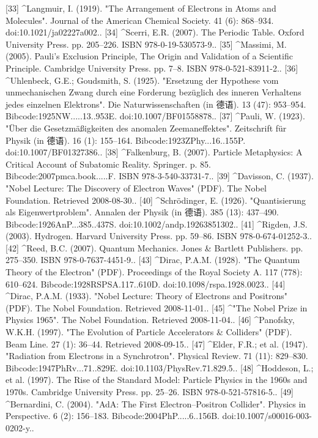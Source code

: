 [33]
^Langmuir, I. (1919). "The Arrangement of Electrons in Atoms and Molecules". Journal of the American Chemical Society. 41 (6): 868–934. doi:10.1021/ja02227a002..
[34]
^Scerri, E.R. (2007). The Periodic Table. Oxford University Press. pp. 205–226. ISBN 978-0-19-530573-9..
[35]
^Massimi, M. (2005). Pauli's Exclusion Principle, The Origin and Validation of a Scientific Principle. Cambridge University Press. pp. 7–8. ISBN 978-0-521-83911-2..
[36]
^Uhlenbeck, G.E.; Goudsmith, S. (1925). "Ersetzung der Hypothese vom unmechanischen Zwang durch eine Forderung bezüglich des inneren Verhaltens jedes einzelnen Elektrons". Die Naturwissenschaften (in 德语). 13 (47): 953–954. Bibcode:1925NW.....13..953E. doi:10.1007/BF01558878..
[37]
^Pauli, W. (1923). "Über die Gesetzmäßigkeiten des anomalen Zeemaneffektes". Zeitschrift für Physik (in 德语). 16 (1): 155–164. Bibcode:1923ZPhy...16..155P. doi:10.1007/BF01327386..
[38]
^Falkenburg, B. (2007). Particle Metaphysics: A Critical Account of Subatomic Reality. Springer. p. 85. Bibcode:2007pmca.book.....F. ISBN 978-3-540-33731-7..
[39]
^Davisson, C. (1937). "Nobel Lecture: The Discovery of Electron Waves" (PDF). The Nobel Foundation. Retrieved 2008-08-30..
[40]
^Schrödinger, E. (1926). "Quantisierung als Eigenwertproblem". Annalen der Physik (in 德语). 385 (13): 437–490. Bibcode:1926AnP...385..437S. doi:10.1002/andp.19263851302..
[41]
^Rigden, J.S. (2003). Hydrogen. Harvard University Press. pp. 59–86. ISBN 978-0-674-01252-3..
[42]
^Reed, B.C. (2007). Quantum Mechanics. Jones & Bartlett Publishers. pp. 275–350. ISBN 978-0-7637-4451-9..
[43]
^Dirac, P.A.M. (1928). "The Quantum Theory of the Electron" (PDF). Proceedings of the Royal Society A. 117 (778): 610–624. Bibcode:1928RSPSA.117..610D. doi:10.1098/rspa.1928.0023..
[44]
^Dirac, P.A.M. (1933). "Nobel Lecture: Theory of Electrons and Positrons" (PDF). The Nobel Foundation. Retrieved 2008-11-01..
[45]
^"The Nobel Prize in Physics 1965". The Nobel Foundation. Retrieved 2008-11-04..
[46]
^Panofsky, W.K.H. (1997). "The Evolution of Particle Accelerators & Colliders" (PDF). Beam Line. 27 (1): 36–44. Retrieved 2008-09-15..
[47]
^Elder, F.R.; et al. (1947). "Radiation from Electrons in a Synchrotron". Physical Review. 71 (11): 829–830. Bibcode:1947PhRv...71..829E. doi:10.1103/PhysRev.71.829.5..
[48]
^Hoddeson, L.; et al. (1997). The Rise of the Standard Model: Particle Physics in the 1960s and 1970s. Cambridge University Press. pp. 25–26. ISBN 978-0-521-57816-5..
[49]
^Bernardini, C. (2004). "AdA: The First Electron–Positron Collider". Physics in Perspective. 6 (2): 156–183. Bibcode:2004PhP.....6..156B. doi:10.1007/s00016-003-0202-y..
